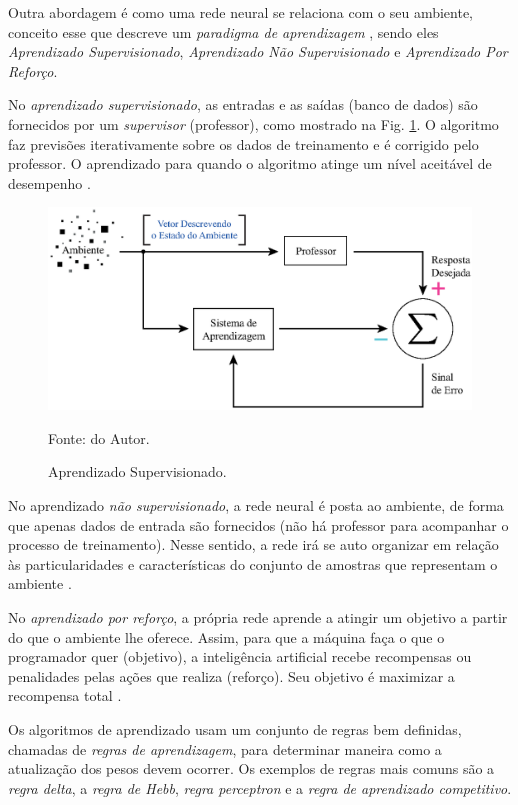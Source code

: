 Outra abordagem é como uma rede neural se relaciona com o seu ambiente, conceito esse que descreve um \textit{paradigma de aprendizagem} \cite{haykin2007redes}, sendo eles \textit{Aprendizado Supervisionado}, \textit{Aprendizado Não Supervisionado} e \textit{Aprendizado Por Reforço}.

No \textit{aprendizado supervisionado}, as entradas e as saídas (banco de dados) são fornecidos por um \textit{supervisor} (professor), como mostrado na Fig. \ref{fig: NeuralNetworkSupervisedLearning}. O algoritmo faz previsões iterativamente sobre os dados de treinamento e é corrigido pelo professor. O aprendizado para quando o algoritmo atinge um nível aceitável de desempenho \cite{haykin2007redes}.

\begin{figure}[H]
    \centering
    \includegraphics{04-Figuras/NeuralNetworkSupervisedLearning.eps}
    \caption{Aprendizado Supervisionado.} \par
    Fonte: do Autor.
    \label{fig: NeuralNetworkSupervisedLearning}
\end{figure}

No aprendizado \textit{não supervisionado}, a rede neural é posta ao ambiente, de forma que apenas dados de entrada são fornecidos (não há professor para acompanhar o processo de treinamento). Nesse sentido, a rede irá se auto organizar em relação às particularidades e características do conjunto de amostras que representam o ambiente \cite{haykin2007redes}.

No \textit{aprendizado por reforço}, a própria rede aprende a atingir um objetivo a partir do que o ambiente lhe oferece. Assim, para que a máquina faça o que o programador quer (objetivo), a inteligência artificial recebe recompensas ou penalidades pelas ações que realiza (reforço). Seu objetivo é maximizar a recompensa total \cite{haykin2007redes}.

Os algoritmos de aprendizado usam um conjunto de regras bem definidas, chamadas de \textit{regras de aprendizagem}, para determinar maneira como a atualização dos pesos devem ocorrer. Os exemplos de regras mais comuns são a \textit{regra delta}, a \textit{regra de Hebb}, \textit{regra perceptron} e a \textit{regra de aprendizado competitivo}.

